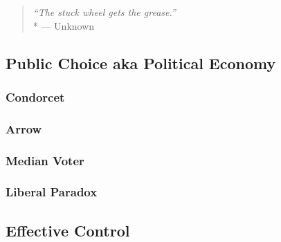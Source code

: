 \begin{quote}
	\emph{``The stuck wheel gets the grease.''}
	\\*
	--- Unknown
\end{quote}

	\subsection[Public Choice]{Public Choice aka Political Economy}



		\subsubsection{Condorcet}

		\subsubsection{Arrow}

		\subsubsection{Median Voter}

		\subsubsection{Liberal Paradox}

	\subsection[Effective Control]{Effective Control}

